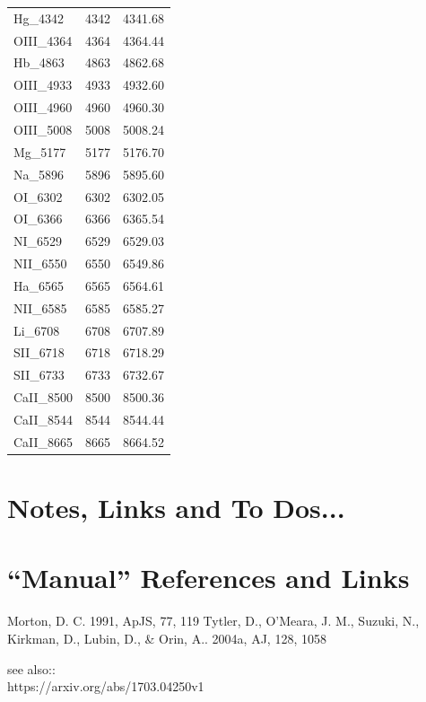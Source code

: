 \documentclass[11pt]{article}
\begin{document}
\begin{table}
\begin{center}
\begin{tabular}{lll}
Hg\_4342    &   4342 &	4341.68 \\
OIII\_4364  &	4364 &	4364.44 \\
Hb\_4863    &   4863 &  4862.68 \\
OIII\_4933  &	4933 &	4932.60 \\
OIII\_4960  &	4960 &  4960.30 \\
OIII\_5008  &	5008 &  5008.24 \\
Mg\_5177    &   5177 &	5176.70 \\
Na\_5896    &   5896 &	5895.60 \\
OI\_6302    &   6302 &	6302.05 \\
OI\_6366    &   6366 &	6365.54 \\
NI\_6529    &   6529 &	6529.03 \\
NII\_6550   &	6550 &	6549.86 \\
Ha\_6565    &   6565 &	6564.61 \\
NII\_6585   &	6585 &	6585.27 \\
Li\_6708    &   6708 &	6707.89 \\
SII\_6718   &	6718 &	6718.29 \\
SII\_6733   &	6733 &	6732.67 \\
CaII\_8500  &   8500 &	8500.36 \\
CaII\_8544  &	8544 &	8544.44 \\
CaII\_8665  &	8665 &	8664.52 \\
      \hline
      \hline
 \end{tabular}
   \end{center}
\end{table}


\section{Notes, Links and To Dos...}


\section{``Manual'' References and Links}
Morton, D. C. 1991, ApJS, 77, 119
Tytler, D., O’Meara, J. M., Suzuki, N., Kirkman, D., Lubin, D., \& Orin, A.. 2004a, AJ, 128, 1058

see also:: \\ 
https://arxiv.org/abs/1703.04250v1



\end{document}
